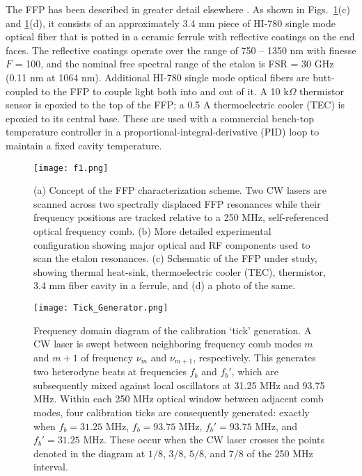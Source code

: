 \documentclass[10pt]{article}
\begin{document}
The FFP has been described in greater detail elsewhere \cite{Halverson:2013}.  As shown in Figs.~\ref{fig:measurement_concept}(c) and \ref{fig:measurement_concept}(d), it consists of an approximately 3.4 mm piece of HI-780 single mode optical fiber that is potted in a ceramic ferrule with reflective coatings on the end faces. The reflective coatings operate over the range of 750 -- 1350 nm with finesse $F$ = 100, and the nominal free spectral range of the etalon is FSR = 30 GHz (0.11 nm at 1064 nm). Additional HI-780 single mode optical fibers are butt-coupled to the FFP to couple light both into and out of it. A 10 k$\Omega$ thermistor sensor is epoxied to the top of the FFP; a 0.5 A thermoelectric cooler (TEC) is epoxied to its central base. These are used with a commercial bench-top temperature controller in a proportional-integral-derivative (PID) loop to maintain a fixed cavity temperature. 

\begin{figure}
\texttt{[image: f1.png]}
\caption{(a) Concept of the FFP characterization scheme.  Two CW lasers are scanned across two spectrally displaced FFP resonances while their frequency positions are tracked relative to a 250 MHz, self-referenced optical frequency comb. (b) More detailed experimental configuration showing major optical and RF components used to scan the etalon resonances.  (c) Schematic of the FFP under study, showing thermal heat-sink, thermoelectric cooler (TEC), thermistor, 3.4 mm fiber cavity in a ferrule, and (d) a photo of the same.}
\label{fig:measurement_concept}
\end{figure}
\begin{figure}
\texttt{[image: Tick\_Generator.png]}
\caption{Frequency domain diagram of the calibration \lq{}tick\rq{} generation. A CW laser is swept between neighboring frequency comb modes $m$ and $m+1$ of frequency $\nu_m$ and $\nu_{m+1}$, respectively.  This generates two heterodyne beats at frequencies $f_b$ and $f_b'$, which are subsequently mixed against local oscillators at 31.25 MHz and 93.75 MHz.  Within each 250 MHz optical window between adjacent comb modes, four calibration ticks are consequently generated: exactly when $f_b=31.25$ MHz, $f_b=93.75$ MHz, $f_b'=93.75$ MHz, and $f_b'=31.25$ MHz. These occur when the CW laser crosses the points denoted in the diagram at $1/8$, $3/8$, $5/8$, and $7/8$ of the 250 MHz interval.}
\label{fig:tick_generator}
\end{figure}
\end{document}
